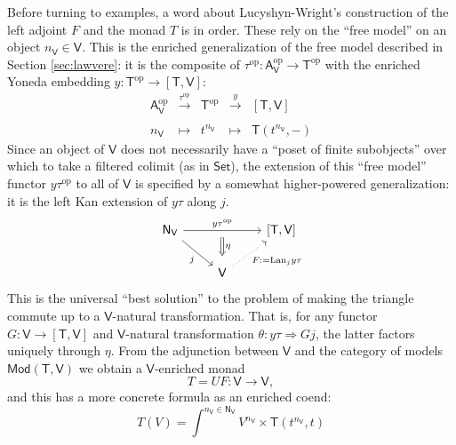 \documentclass{amsart}
\theoremstyle{definition}
\newcommand{\Set}{\mathsf{Set}}
\newcommand{\Mod}{\mathsf{Mod}}
\newcommand{\NN}{\mathsf{N}}
\newcommand{\A}{\mathsf{A}}
\newcommand{\V}{\mathsf{V}}
\newcommand{\T}{\mathsf{T}}
\newcommand{\op}{\mathrm{op}}
\newcommand{\maps}{\colon}
\begin{document}
Before turning to examples, a word about Lucyshyn-Wright's construction of the left adjoint $F$ and the monad $T$ is in order.  These rely on the ``free model'' on an object $n_\V \in \V$.   This is the enriched generalization of the free model described in Section \ref{sec:lawvere}: it is the composite of $\tau^\op\maps \A_\V^\op \to \T^\op$ with the enriched Yoneda embedding $y\maps \T^\op \to [\T,\V]$:
\[
\begin{array}{rllll}
\A_\V^\op & \xrightarrow{\tau^\op} & \T^\op & \xrightarrow{y} & \left[\T,\V\right]\\
\\
n_\V & \mapsto & t^{n_\V} & \mapsto & \T(t^{n_\V},-)
\end{array}
\]
Since an object of $\V$ does not necessarily have a ``poset of finite subobjects'' over which to take a filtered colimit (as in $\Set$), the extension of this ``free model'' functor $y \tau^\op$ to all of $\V$ is specified by a somewhat higher-powered generalization: it is the left Kan extension of $y\tau$ along $j$.
\[\begin{tikzcd}
\NN_\V \arrow[rr,"y\tau^\op"{name=y}] \arrow[swap,rd,"j"] & & \left[\T,\V\right]\\
& \V \arrow[swap,dotted, ru,"F:=\mathrm{Lan}_jy\tau"] \arrow[Rightarrow,from=y,"\eta", shorten >=0.2cm,shorten <=.2cm]
\end{tikzcd}\]
This is the universal ``best solution'' to the problem of making the triangle commute up to a $\V$-natural transformation.  That is, for any functor $G \maps \V \to [\T,\V]$ and $\V$-natural transformation $\theta \maps y\tau \Rightarrow Gj$, the latter factors uniquely through $\eta$.
From the adjunction between $\V$ and the category of models $\Mod(\T,\V)$ we obtain a $\V$-enriched monad
\[       T = U F \maps \V \to \V, \]
and this has a more concrete formula as an enriched coend:
\[
T(V) = \int^{n_\V\in \NN_\V} V^{n_\V} \times \T(t^{n_\V},t)
\]
\end{document}
